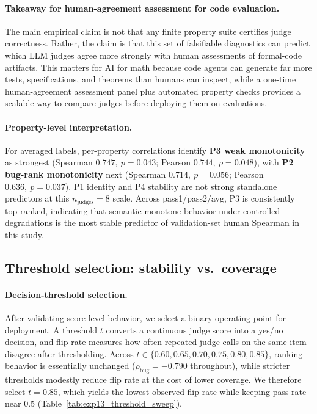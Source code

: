 \documentclass{article}
\begin{document}
\paragraph{Takeaway for human-agreement assessment for code evaluation.}
The main empirical claim is not that any finite property suite certifies judge correctness. Rather, the claim is that this set of falsifiable diagnostics can predict which LLM judges agree more strongly with human assessments of formal-code artifacts. This matters for AI for math because code agents can generate far more tests, specifications, and theorems than humans can inspect, while a one-time human-agreement assessment panel plus automated property checks provides a scalable way to compare judges before deploying them on evaluations.

\paragraph{Property-level interpretation.}
For averaged labels, per-property correlations identify
\textbf{P3 weak monotonicity} as strongest (Spearman \(0.747,\ p=0.043\); Pearson \(0.744,\ p=0.048\)),
with \textbf{P2 bug-rank monotonicity} next (Spearman \(0.714,\ p=0.056\); Pearson \(0.636,\ p=0.037\)).
P1 identity and P4 stability are not strong standalone predictors at this \(n_\text{judges}=8\) scale.
Across pass1/pass2/avg, P3 is consistently top-ranked, indicating that semantic monotone behavior under controlled degradations is the most stable predictor of validation-set human Spearman in this study.

\subsection{Threshold selection: stability vs.\ coverage}
\paragraph{Decision-threshold selection.}
After validating score-level behavior, we select a binary operating point for deployment. A threshold \(t\) converts a continuous judge score into a yes/no decision, and flip rate measures how often repeated judge calls on the same item disagree after thresholding. Across \(t\in\{0.60,0.65,0.70,0.75,0.80,0.85\}\), ranking behavior is essentially unchanged (\(\rho_{\text{bug}}=-0.790\) throughout), while stricter thresholds modestly reduce flip rate at the cost of lower coverage. We therefore select \(t=0.85\), which yields the lowest observed flip rate while keeping pass rate near \(0.5\) (Table~\ref{tab:exp13_threshold_sweep}).
\end{document}
